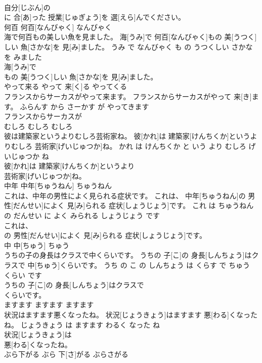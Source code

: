 \documentclass[8pt]{extreport}
\begin{document}
\begin{CJK}{UTF8}{min}
\\	自分[じぶん]の
\\	に 合[あ]った 授業[じゅぎょう]を 選[えら]んでください。			
\\	何百	何百[なんびゃく]	なんびゃく	
\\	海で何百もの美しい魚を見ました。	海[うみ]で 何百[なんびゃく]もの 美[うつく]しい 魚[さかな]を 見[み]ました。	うみ で なんびゃく も の うつくしい さかな を みました	
\\	海[うみ]で
\\	もの 美[うつく]しい 魚[さかな]を 見[み]ました。			
\\	やって来る	やって 来[く]る	やってくる	
\\	フランスからサーカスがやって来ます。	フランスからサーカスがやって 来[き]ます。	ふらんす から さーかす が やってきます	
\\	フランスからサーカスが
\\	むしろ	むしろ	むしろ	
\\	彼は建築家というよりむしろ芸術家ね。	彼[かれ]は 建築家[けんちくか]というよりむしろ 芸術家[げいじゅつか]ね。	かれ は けんちくか と いう より むしろ げいじゅつか ね	
\\	彼[かれ]は 建築家[けんちくか]というより
\\	芸術家[げいじゅつか]ね。			
\\	中年	中年[ちゅうねん]	ちゅうねん	
\\	これは、中年の男性によく見られる症状です。	これは、 中年[ちゅうねん]の 男性[だんせい]によく 見[み]られる 症状[しょうじょう]です。	これ は ちゅうねん の だんせい に よく みられる しょうじょう です	
\\	これは、
\\	の 男性[だんせい]によく 見[み]られる 症状[しょうじょう]です。			
\\	中	中[ちゅう]	ちゅう	
\\	うちの子の身長はクラスで中くらいです。	うちの 子[こ]の 身長[しんちょう]はクラスで 中[ちゅう]くらいです。	うち の こ の しんちょう は くらす で ちゅう くらい です	
\\	うちの 子[こ]の 身長[しんちょう]はクラスで
\\	くらいです。			
\\	ますます	ますます	ますます	
\\	状況はますます悪くなったね。	状況[じょうきょう]はますます 悪[わる]くなったね。	じょうきょう は ますます わるく なった ね	
\\	状況[じょうきょう]は
\\	悪[わる]くなったね。			
\\	ぶら下がる	ぶら 下[さ]がる	ぶらさがる	

\end{CJK}
\end{document}
